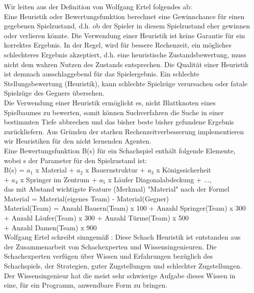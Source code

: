 Wir leiten aus der Definition von Wolfgang Ertel folgendes ab:\\ 
Eine Heuristik oder Bewertungsfunktion berechnet eine Gewinnchance für einen gegebenen Spielzustand, d.h. ob der Spieler in diesem Spielzustand eher gewinnen oder verlieren könnte. Die Verwendung einer Heuristik ist keine Garantie für ein korrektes Ergebnis. In der Regel, wird für bessere Rechenzeit, ein mögliches schlechteres Ergebnis akzeptiert, d.h. eine heuristische Zustandsbewertung, muss nicht dem wahren Nutzen des Zustands entsprechen. Die Qualität einer Heuristik ist demnach ausschlaggebend für das Spielergebnis. Ein schlechte Stellungsbewertung (Heuristik), kann schlechte Spielzüge verursachen oder fatale Spielzüge des Gegners übersehen. \\

Die Verwendung einer Heuristik ermöglicht es, nicht Blattknoten eines Spielbaumes zu bewerten, somit können Suchverfahren die Suche in einer bestimmten Tiefe abbrechen und das bisher beste bisher gefundene Ergebnis zurückliefern. Aus Gründen der starken Rechenzeitverbesserung implementieren wir Heuristiken für den nicht lernenden Agenten. \\

Eine Bewertungsfunktion B(s) für ein Schachspiel enthält folgende Elemente, wobei s der Parameter für den Spielzustand ist\cite[119]{Ertel}: \\

B(s) = $a_1$ x Material +  $a_2$ x Bauernstruktur + $a_3$ x Königssicherheit \\
\tab \tab + $a_4$ x Springer im Zentrum + $a_5$ x Läufer Diagonalabdeckung + ..., \\ 

das mit Abstand wichtigste Feature (Merkmal) "Material" nach der Formel \\

\tab \tab Material = Material(eigenes Team) - Material(Gegner) \\

Material(Team) = Anzahl Bauern(Team) x 100 + Anzahl Springer(Team) x 300 \\
\tab \tab \tab + Anzahl Läufer(Team) x 300 + Anzahl Türme(Team) x 500 \\
\tab \tab \tab + Anzahl Damen(Team) x 900 \\

Wolfgang Ertel schreibt sinngemäß \cite[118]{Ertel}:
Diese Schach Heuristik ist entstanden aus der Zusammenarbeit von Schachexperten und Wissensingenieuren. Die Schachexperten verfügen über Wissen und Erfahrungen bezüglich des Schachspiels, der Strategien, guter Zugstellungen und schlechter Zugstellungen. Der Wissensingenieur hat die meist sehr schwierige Aufgabe dieses Wissen in eine, für ein Programm, anwendbare Form zu bringen. \\

